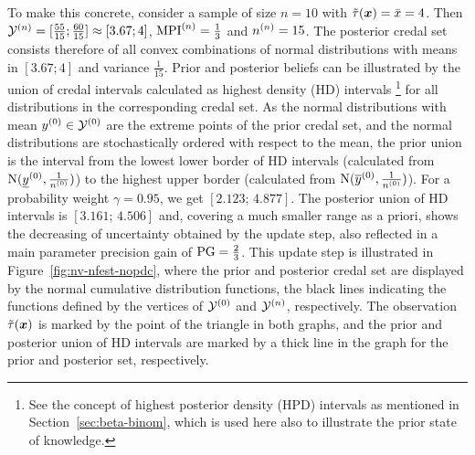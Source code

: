 \begin{example}
To make this concrete, consider a sample of size $n = 10$
with $\tilde{\tau}({\bm x}) = \bar{x} = 4$.
Then $\mathcal{Y}^{(n)} = [\frac{55}{15} ; \frac{60}{15}] \approx [3.67 ; 4]$,
${\rm MPI}^{(n)}=\frac{1}{3}$ and $n^{(n)} = 15$. The posterior credal set
consists therefore of all convex combinations of normal
distributions with means in $[3.67 ; 4]$ and variance
$\frac{1}{15}$.
%
%
Prior and posterior beliefs can be illustrated by the union of
credal intervals calculated as highest density (HD) intervals%
\footnote{See the concept of highest posterior density (HPD) intervals
as mentioned in Section~\ref{sec:beta-binom}, which is used here also to
illustrate the prior state of knowledge.}
for all distributions in the corresponding credal set.
As the normal distributions with mean $y^{(0)} \in \mathcal{Y}^{(0)}$ are the extreme points of the prior credal set,
and the normal distributions are stochastically ordered with respect to the mean,
the prior union is the interval from the lowest lower border of HD intervals
(calculated from $\operatorname{N}(\underline{y}^{(0)}, \frac{1}{n^{(0)}})$) to the highest upper border
(calculated from $\operatorname{N}(\overline{y}^{(0)}, \frac{1}{n^{(0)}})$).
For a probability weight $\gamma = 0.95$, we get $[2.123;\, 4.877]$.
%
%
The posterior union of HD intervals is
$[3.161;\, 4.506]$ and, covering a much smaller range as a priori, shows
the decreasing of uncertainty obtained by the update step, also
reflected in a main parameter precision gain of ${\rm PG}=\frac{2}{3}$.
This update step is illustrated in Figure~\ref{fig:nv-nfest-nopdc},
where the prior and posterior credal set are displayed by the normal
cumulative distribution functions, the black lines indicating the
functions defined by the vertices of $\mathcal{Y}^{(0)}$ and $\mathcal{Y}^{(n)}$, respectively. %
The observation $\tilde{\tau}({\bm x})$ is marked by the point of the triangle
in both graphs, and the prior and posterior union of HD intervals are marked
by a thick line in the graph for the prior and posterior set, respectively.
\end{example}

